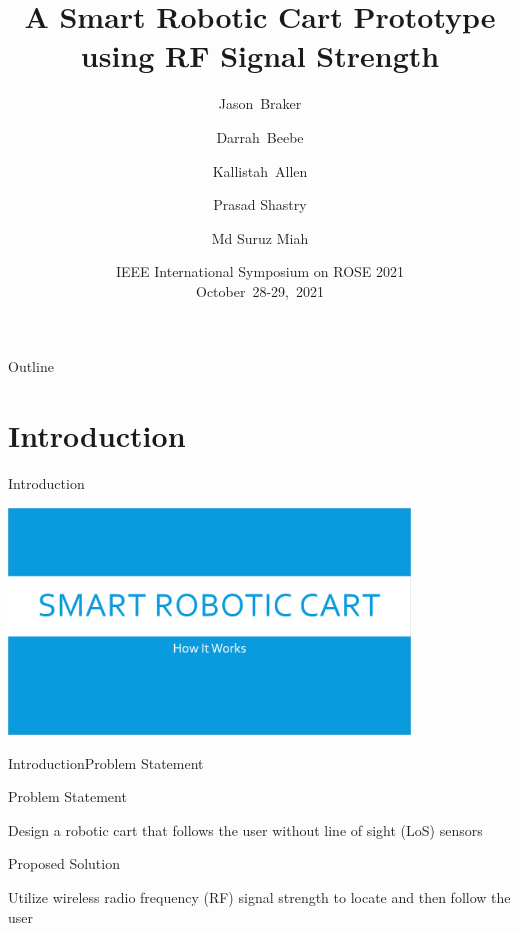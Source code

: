 \documentclass{beamer}
\title[A Smart Robotic Cart]{A Smart Robotic Cart Prototype using RF Signal Strength}
\author[J.~Braker, D.~Beebe, K.~Allen, P.~Shastry, S.~Miah]{Jason~Braker \and Darrah~Beebe \and Kallistah~Allen \and Prasad Shastry \and Md Suruz Miah}
\institute[Bradley University] %
{
  Department of Electrical and Computer Engineering\\
  Bradley University\\
  1501 W. Bradley Avenue\\
  Peoria, IL, 61625, USA
}
\date[]{IEEE International Symposium on ROSE 2021\\
October~28-29,~2021}
\begin{document}
\begin{frame}
  \titlepage
\end{frame}

\begin{frame}{Outline} 
  \tableofcontents%
\end{frame}

\section{Introduction}

\begin{frame}{Introduction}{}
 \begin{center}
    \href{videos/smartRoboticCartIntroVideo.mp4}{\includegraphics[width=0.8\textwidth]{figs/img/finalPresVideoTitle.png}}
  \end{center}
\end{frame}

\begin{frame}{Introduction}{Problem Statement}
  \begin{block}{Problem Statement}
    \begin{LARGE}
      Design a robotic cart that follows the user without line of sight (LoS) sensors
    \end{LARGE}
  \end{block}
  \pause
  \begin{block}{Proposed Solution}
    \begin{LARGE}
      Utilize wireless radio frequency (RF) signal strength to locate and then follow the user
    \end{LARGE}
  \end{block}
\end{frame}

\end{document}
